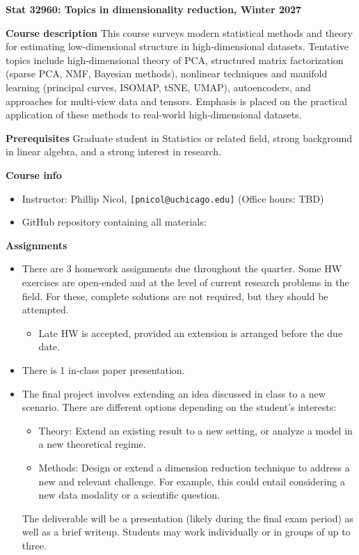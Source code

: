 \documentclass[11pt]{article}
\begin{document}
\begin{center}
{\large \textbf{Stat 32960: Topics in dimensionality reduction, Winter 2027}} \\
\end{center}




\textbf{Course description} \quad 
This course surveys modern statistical methods and theory for estimating low-dimensional structure in high-dimensional datasets. Tentative topics include high-dimensional theory of PCA, structured matrix factorization (sparse PCA, NMF, Bayesian methods), nonlinear techniques and manifold learning (principal curves, ISOMAP, tSNE, UMAP), autoencoders, and approaches for multi-view data and tensors. Emphasis is placed on the practical application of these methods to real-world high-dimensional datasets.

\medskip

\textbf{Prerequisites} \quad Graduate student in Statistics or related field, strong background in linear algebra, and a
strong interest in research. 

\medskip

\textbf{Course info}

\begin{itemize}
  \item Instructor: Phillip Nicol, \texttt{[pnicol@uchicago.edu]} (Office hours: TBD)
  \item GitHub repository containing all materials: 
\end{itemize}

\textbf{Assignments}

\begin{itemize}
  \item There are 3 homework assignments due throughout the quarter. Some HW exercises are open-ended and at the level of current research problems in the field. For these, complete solutions are not required, but they should be attempted.
  \begin{itemize}
      \item Late HW is accepted, provided an extension is arranged before the due date.
  \end{itemize}
  \item There is 1 in-class paper presentation.
  \item The final project involves extending an idea discussed in class to a new scenario. There are different options depending on the student's interests:
  \begin{itemize}
      \item Theory: Extend an existing result to a new setting, or analyze a model in a new theoretical regime. 
      \item Methods: Design or extend a dimension reduction technique to address a new and relevant challenge. For example, this could entail considering a new data modality or a scientific question. 
  \end{itemize}
  The deliverable will be a presentation (likely during the final exam period) as well as a brief writeup. Students may work individually or in groups of up to three. 
  
\end{itemize}
\end{document}
